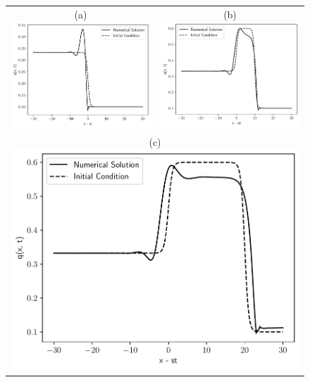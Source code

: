     \begin{figure}
      \centering
      \begin{tabular}{cc}
      (a)\includegraphics[scale=0.35]{figures/case_2_1.pdf} &
      (b)\includegraphics[scale=0.35]{figures/case_2_2.pdf} \\
      \multicolumn{2}{c}{(c)\includegraphics[scale=0.35]{figures/case_2_3.pdf}}

\end{tabular}
\end{figure}
